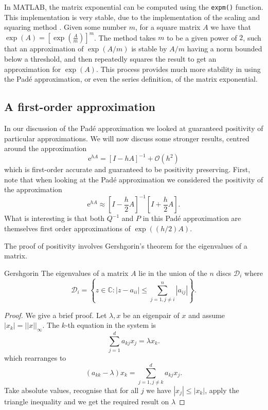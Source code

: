 In MATLAB, the matrix exponential can be computed using the \texttt{expm()} function.
This implementation is very stable, due to the implementation of the scaling and squaring method \cite{higham2005scaling,moler2003dubious}.
Given some number $m$, for a square matrix $A$ we have that $\exp(A) = \left[\exp\left(\frac{A}{m}\right)\right]^m$.
The method takes $m$ to be a given power of $2$, such that an approximation of $\exp(A/m)$ is stable by $A/m$ having a norm bounded below a threshold, and then repeatedly squares the result to get an approximation for $\exp(A)$.
This process provides much more stability in using the Pad\'e approximation, or even the series definition, of the matrix exponential.

\subsection{A first-order approximation}

In our discussion of the Pad\'e approximation we looked at guaranteed positivity of particular approximations.
We will now discuss some stronger results, centred around the approximation
\begin{equation*}
    \mathrm{e}^{hA} = \left[
        I - hA
    \right]^{-1} + \mathcal{O}(h^2)
\end{equation*}
which is first-order accurate and guaranteed to be positivity preserving.
First, note that when looking at the Pad\'e approximation we considered the positivity of the approximation
\begin{equation*}
    \mathrm{e}^{hA} \approx \left[ I - \frac{h}{2}A \right]^{-1} \left[ I + \frac{h}{2}A \right].
\end{equation*}
What is interesting is that both $Q^{-1}$ and $P$ in this Pad\'e approximation are themselves first order approximations of $\exp((h/2)A)$.

The proof of positivity involves Gershgorin's theorem for the eigenvalues of a matrix.
\begin{theorem}{Gershgorin}
    The eigenvalues of a matrix $A$ lie in the union of the $n$ discs $\mathcal{D}_i$ where
    \begin{equation*}
        \mathcal{D}_i = \left\{ z \in \mathds{C}: |z - a_{ii}| \leq \sum_{
            j = 1, j \ne i
        }^{n} |a_{ij}| \right\}.
    \end{equation*}    
\end{theorem}
\begin{proof}
    We give a brief proof. Let $\lambda,x$ be an eigenpair of $x$ and assume $|x_k| = ||x||_\infty$.
    The $k$-th equation in the system is
    \begin{equation*}
        \sum_{j=1}^{d}a_{kj}x_j = \lambda x_k.
    \end{equation*}
    which rearranges to
    \begin{equation*}
        (a_{kk} - \lambda) x_k = \sum_{j=1, j \neq k}^{d} a_{kj}x_j.
    \end{equation*}
    Take absolute values, recognise that for all $j$ we have $|x_j| \leq |x_k|$, apply the triangle inequality and we get the required result on $\lambda$
\end{proof}

